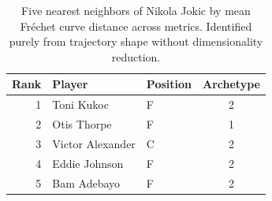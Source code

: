 \begin{table}[htbp]
  \centering\small
  \begin{tabular}{rllc}
    \toprule
    Rank & Player & Position & Archetype \\
    \midrule
    1 & Toni Kukoc & F & 2 \\
    2 & Otis Thorpe & F & 1 \\
    3 & Victor Alexander & C & 2 \\
    4 & Eddie Johnson & F & 2 \\
    5 & Bam Adebayo & F & 2 \\
    \bottomrule
  \end{tabular}
  \caption{Five nearest neighbors of Nikola Jokic by mean Fr\'{e}chet curve distance across metrics. Identified purely from trajectory shape without dimensionality reduction.}
  \label{tab:Nikola_Jokic_frechet_curve_neighbors}
\end{table}

